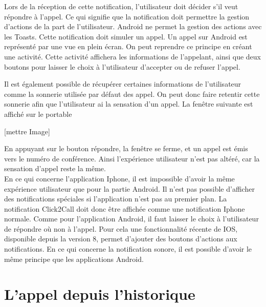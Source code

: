 Lors de la réception de cette notification, l'utilisateur doit décider s'il veut répondre à l'appel. Ce qui signifie que la notification doit permettre la gestion d'actions de la part de l'utilisateur. Android ne permet la gestion des actions avec les Toasts. Cette notification doit simuler un appel. Un appel sur Android est représenté par une vue en plein écran. On peut reprendre ce principe en créant une activité. Cette activité affichera les informations de l'appelant, ainsi que deux boutons pour laisser le choix à l'utilisateur d'accepter ou de refuser l'appel.

Il est également possible de récupérer certaines informations de l'utilisateur comme la sonnerie utilisée par défaut des appel. On peut donc faire retentir cette sonnerie afin que l'utilisateur ai la sensation d'un appel. La fenêtre suivante est affiché sur le portable

[mettre Image]

En appuyant sur le bouton répondre, la fenêtre se ferme, et un appel est émis vers le numéro de conférence. Ainsi l'expérience utilisateur n'est pas altéré, car la sensation d'appel reste la même.\\

En ce qui concerne l'application Iphone, il est impossible d'avoir la même expérience utilisateur que pour la partie Android. Il n'est pas possible d'afficher des notifications spéciales si l'application n'est pas au premier plan. La notification Click2Call  doit donc être affichée comme une notification Iphone normale. Comme pour l'application Android, il faut laisser le choix à l'utilisateur de répondre où non à l'appel. Pour cela une fonctionnalité récente de IOS, disponible depuis la version 8, permet d'ajouter des boutons d'actions aux notifications. En ce qui concerne la notification sonore, il est possible d'avoir le même principe que les applications Android.


\section{L'appel depuis l'historique}


